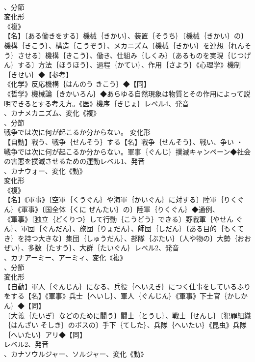 \documentclass[8pt]{extreport}
\begin{document}
\begin{CJK}{UTF8}{min}
\\	、分節
\\	変化形 
\\	《複》
\\	【名】〔ある働きをする〕機械｛きかい｝、装置｛そうち｝〔機械｛きかい｝の〕機構｛きこう｝、構造｛こうぞう｝、メカニズム〔機械｛きかい｝を連想｛れんそう｝させる〕機構｛きこう｝、働き、仕組み｛しくみ｝〔あるものを実現｛じつげん｝する〕方法｛ほうほう｝、過程｛かてい｝、作用｛さよう｝《心理学》機制｛きせい｝◆【参考】
\\	《化学》反応機構｛はんのう きこう｝◆【同】
\\	《哲学》機械論｛きかいろん｝◆あらゆる自然現象は物質とその作用によって説明できるとする考え方。《医》機序｛きじょ｝レベル4、発音
\\	、カナメカニズム、変化《複》
\\	、分節
\\	戦争では次に何が起こるか分からない。	変化形 
\\	【自動】戦う、戦争｛せんそう｝する【名】戦争｛せんそう｝、戦い、争い ・
\\	戦争では次に何が起こるか分からない。軍事｛ぐんじ｝撲滅キャンペーン◆社会の害悪を撲滅させるための運動レベル1、発音
\\	、カナウォー、変化《動》
\\	変化形 
\\	《複》
\\	【名】《軍事》〔空軍｛くうぐん｝や海軍｛かいぐん｝に対する〕陸軍｛りくぐん｝《軍事》〔国全体｛くに ぜんたい｝の〕陸軍｛りくぐん｝◆通例、
\\	《軍事》〔独立｛どくりつ｝して行動｛こうどう｝できる〕野戦軍｛やせん ぐん｝、軍団｛ぐんだん｝、旅団｛りょだん｝、師団｛しだん｝〔ある目的｛もくてき｝を持つ大きな〕集団｛しゅうだん｝、部隊｛ぶたい｝〔人や物の〕大勢｛おおぜい｝、多数｛たすう｝、大群｛たいぐん｝レベル2、発音
\\	、カナアーミー、アーミィ、変化《複》
\\	、分節
\\	変化形 
\\	【自動】軍人｛ぐんじん｝になる、兵役｛へいえき｝につく仕事をしているふりをする【名】《軍事》兵士｛へいし｝、軍人｛ぐんじん｝《軍事》下士官｛かしかん｝◆【同】
\\	〔大義｛たいぎ｝などのために闘う〕闘士｛とうし｝、戦士｛せんし｝〔犯罪組織｛はんざい そしき｝のボスの〕手下｛てした｝、兵隊｛へいたい｝《昆虫》兵隊｛へいたい｝アリ◆【同】
\\	レベル2、発音
\\	、カナソウルジャー、ソルジャー、変化《動》

\end{CJK}
\end{document}
